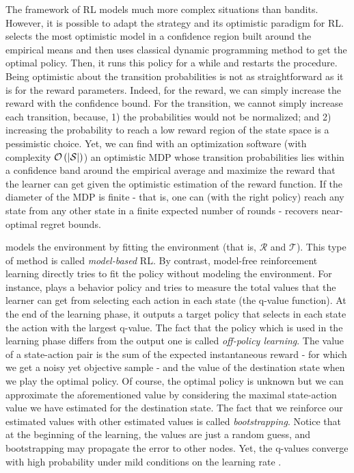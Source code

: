 {%
The framework of RL models much more complex situations than bandits. However, it is possible to adapt the \UCB strategy and its optimistic paradigm for RL. \UCRLtwo \citep{auer2009near} selects the most optimistic model in a confidence region built around the empirical means and then uses classical dynamic programming method to get the optimal policy. Then, it runs this policy for a while and restarts the procedure. Being optimistic about the transition probabilities is not as straightforward as it is for the reward parameters. Indeed, for the reward, we can simply increase the reward with the confidence bound. For the transition, we cannot simply increase each transition, because, 1) the probabilities would not be normalized; and 2) increasing the probability to reach a low reward region of the state space is a pessimistic choice. Yet, we can find with an optimization software (with complexity $\mathcal{O}\left(|\mathcal{S}|\right)$) an optimistic MDP whose transition probabilities lies within a confidence band around the empirical average and maximize the reward that the learner can get given the optimistic estimation of the reward function. If the diameter of the MDP is finite - that is, one can (with the right policy) reach any state from any other state in a finite expected number of rounds - \UCRLtwo recovers near-optimal regret bounds. 

\UCRLtwo models the environment by fitting the environment (that is, $\mathcal{R}$ and $\mathcal{T}$). This type of method is called \emph{model-based} RL. By contrast, model-free reinforcement learning directly tries to fit the policy without modeling the environment. For instance, \QLearning \citep{watkins1989learning} plays a behavior policy and tries to measure the total values that the learner can get from selecting each action in each state (the q-value function). At the end of the learning phase, it outputs a target policy that selects in each state the action with the largest q-value. The fact that the policy which is used in the learning phase differs from the output one is called \emph{off-policy learning}. The value of a state-action pair is the sum of the expected instantaneous reward - for which we get a noisy yet objective sample - and the value of the destination state when we play the optimal policy. Of course, the optimal policy is unknown but we can approximate the aforementioned value by considering the maximal state-action value we have estimated for the destination state. The fact that we reinforce our estimated values with other estimated values is called \emph{bootstrapping}. Notice that at the beginning of the learning, the values are just a random guess, and bootstrapping may propagate the error to other nodes. Yet, the q-values converge with high probability under mild conditions on the learning rate \citep{watkins1992q}.

}

